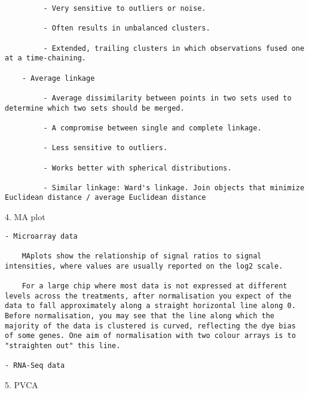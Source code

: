 \documentclass[
]{book}
\begin{document}
\begin{verbatim}
         - Very sensitive to outliers or noise.

         - Often results in unbalanced clusters.

         - Extended, trailing clusters in which observations fused one at a time-chaining.

    - Average linkage

         - Average dissimilarity between points in two sets used to determine which two sets should be merged.

         - A compromise between single and complete linkage.

         - Less sensitive to outliers.

         - Works better with spherical distributions.

         - Similar linkage: Ward's linkage. Join objects that minimize Euclidean distance / average Euclidean distance
\end{verbatim}

4. MA plot

\begin{verbatim}
- Microarray data

    MAplots show the relationship of signal ratios to signal intensities, where values are usually reported on the log2 scale.

    For a large chip where most data is not expressed at different levels across the treatments, after normalisation you expect of the data to fall approximately along a straight horizontal line along 0. Before normalisation, you may see that the line along which the majority of the data is clustered is curved, reflecting the dye bias of some genes. One aim of normalisation with two colour arrays is to "straighten out" this line.

- RNA-Seq data
\end{verbatim}

5. PVCA
\end{document}

